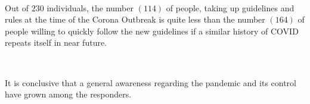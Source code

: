 \

Out of $230$ individuals, the number $(114)$ of people, taking up guidelines and rules at the time of the Corona Outbreak is quite less than the number $(164)$ of people willing to quickly follow the new guidelines if a similar history of COVID repeats itself in near future. 

\

It is conclusive that a general awareness regarding the pandemic and its control have grown among the responders.